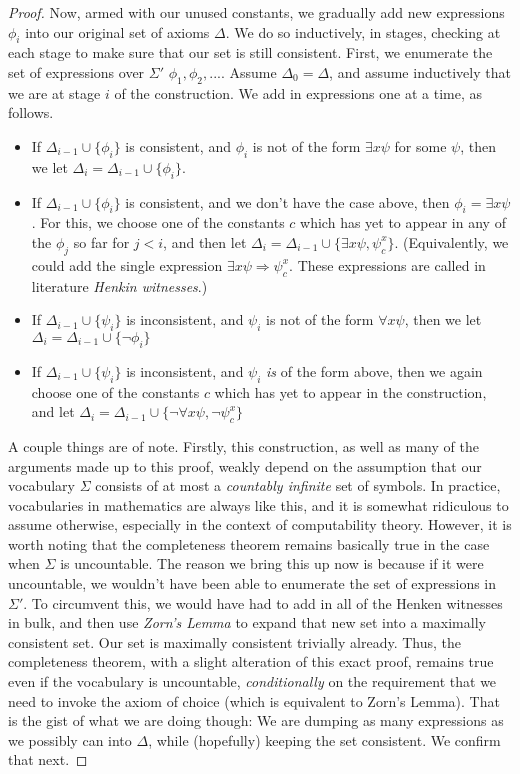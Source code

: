 \documentclass{article}
\theoremstyle{definition}
\theoremstyle{plain}
\theoremstyle{theorem}
\begin{document}
\begin{proof}
    \par Now, armed with our unused constants, we gradually add new expressions $\phi_i$ into our original set of axioms $\Delta$. We do so inductively, in stages, checking at each stage to make sure that our set is still consistent. First, we enumerate the set of expressions over $\Sigma'$ $\phi_1,\phi_2,...$. Assume $\Delta_0 = \Delta$, and assume inductively that we are at stage $i$ of the construction. We add in expressions one at a time, as follows. 
    \begin{itemize}
        \item If $\Delta_{i-1} \cup \{\phi_i\}$ is consistent, and $\phi_i$ is not of the form $\exists x \psi$ for some $\psi$, then we let $\Delta_i = \Delta_{i-1} \cup \{\phi_i\}$.
        \item If $\Delta_{i-1} \cup \{\phi_i\}$ is consistent, and we don't have the case above, then $\phi_i = \exists x \psi$. For this, we choose one of the constants $c$ which has yet to appear in any of the $\phi_j$ so far for $j<i$, and then let $\Delta_i = \Delta_{i-1} \cup \{\exists x \psi, \psi_c^x\}$. (Equivalently, we could add the single expression $\exists x \psi \Rightarrow \psi_c^x$. These expressions are called in literature \textit{Henkin witnesses}.)
        \item If $\Delta_{i-1} \cup \{\psi_i\}$ is inconsistent, and $\psi_i$ is not of the form $\forall x \psi$, then we let $\Delta_i = \Delta_{i-1} \cup \{\neg \phi_i\}$
        \item If $\Delta_{i-1} \cup \{\psi_i\}$ is inconsistent, and $\psi_i$ \textit{is} of the form above, then we again choose one of the constants $c$ which has yet to appear in the construction, and let $\Delta_i = \Delta_{i-1} \cup \{\neg \forall x \psi, \neg \psi_c^x\}$
    \end{itemize}
    A couple things are of note. Firstly, this construction, as well as many of the arguments made up to this proof, weakly depend on the assumption that our vocabulary $\Sigma$ consists of at most a \textit{countably infinite} set of symbols. In practice, vocabularies in mathematics are always like this, and it is somewhat ridiculous to assume otherwise, especially in the context of computability theory. However, it is worth noting that the completeness theorem remains basically true in the case when $\Sigma$ is uncountable. The reason we bring this up now is because if it were uncountable, we wouldn't have been able to enumerate the set of expressions in $\Sigma'$. To circumvent this, we would have had to add in all of the Henken witnesses in bulk, and then use \textit{Zorn's Lemma} to expand that new set into a maximally consistent set. Our set is maximally consistent trivially already. Thus, the completeness theorem, with a slight alteration of this exact proof, remains true even if the vocabulary is uncountable, \textit{conditionally} on the requirement that we need to invoke the axiom of choice (which is equivalent to Zorn's Lemma). That is the gist of what we are doing though: We are dumping as many expressions as we possibly can into $\Delta$, while (hopefully) keeping the set consistent. We confirm that next.

\end{proof}
\end{document}

